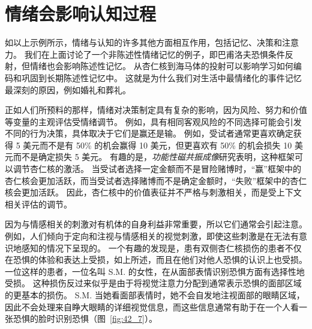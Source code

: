 \section{情绪会影响认知过程}

如以上示例所示，情绪与认知的许多其他方面相互作用，包括记忆、决策和注意力。
我们在上面讨论了一个非陈述性情绪记忆的例子，即巴甫洛夫恐惧条件反射，但情绪也会影响陈述性记忆。
从杏仁核到海马体的投射可以影响学习如何编码和巩固到长期陈述性记忆中。
这就是为什么我们对生活中最情绪化的事件记忆最深刻的原因，例如婚礼和葬礼。


正如人们所预料的那样，情绪对决策制定具有复杂的影响，因为风险、努力和价值等变量的主观评估受情绪调节。
例如，具有相同客观风险的不同选择可能会引发不同的行为决策，具体取决于它们是赢还是输。
例如，受试者通常更喜欢确定获得 5 美元而不是有 50\% 的机会赢得 10 美元，但更喜欢有 50\% 的机会损失 10 美元而不是确定损失 5 美元。
有趣的是，\textit{功能性磁共振成像}研究表明，这种框架可以调节杏仁核的激活。
当受试者选择一定金额而不是冒险赌博时，“赢”框架中的杏仁核会更加活跃，而当受试者选择赌博而不是确定金额时，“失败”框架中的杏仁核会更加活跃。
因此，杏仁核中的价值表征并不严格与刺激相关，而是受上下文相关评估的调节。


因为与情感相关的刺激对有机体的自身利益非常重要，所以它们通常会引起注意。
例如，人们倾向于定向和注视与情感相关的视觉刺激，即使这些刺激是在无法有意识地感知的情况下呈现的。
一个有趣的发现是，患有双侧杏仁核损伤的患者不仅在恐惧的体验和表达上受损，如上所述，而且在他们对他人恐惧的认识上也受损。
一位这样的患者，一位名叫 S.M. 的女性，在从面部表情识别恐惧方面有选择性地受损。
这种损伤反过来似乎是由于将视觉注意力分配到通常表示恐惧的面部区域的更基本的损伤。
S.M. 当她看面部表情时，她不会自发地注视面部的眼睛区域，因此不会处理来自睁大眼睛的详细视觉信息，而这些信息通常有助于在一个人看一张恐惧的脸时识别恐惧（图~\ref{fig:42_7}）。


